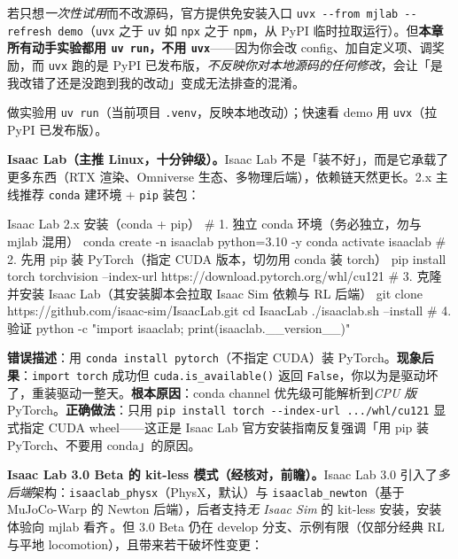 若只想\emph{一次性试用}而不改源码，官方提供免安装入口 \verb|uvx --from mjlab --refresh demo|（\verb|uvx| 之于 \verb|uv| 如 \verb|npx| 之于 \verb|npm|，从 PyPI 临时拉取运行）。但\textbf{本章所有动手实验都用 \texttt{uv run}，不用 \texttt{uvx}}——因为你会改 config、加自定义项、调奖励，而 \verb|uvx| 跑的是 PyPI 已发布版，\emph{不反映你对本地源码的任何修改}，会让「是我改错了还是没跑到我的改动」变成无法排查的混淆。

\begin{note}[一句话记忆]
做实验用 \verb|uv run|（当前项目 \texttt{.venv}，反映本地改动）；快速看 demo 用 \verb|uvx|（拉 PyPI 已发布版）。
\end{note}

\textbf{Isaac Lab（主推 Linux，十分钟级）。}Isaac Lab 不是「装不好」，而是它承载了更多东西（RTX 渲染、Omniverse 生态、多物理后端），依赖链天然更长。2.x 主线推荐 \verb|conda| 建环境 + \verb|pip| 装包：

\begin{codebox}[bash]{Isaac Lab 2.x 安装（conda + pip）}
# 1. 独立 conda 环境（务必独立，勿与 mjlab 混用）
conda create -n isaaclab python=3.10 -y
conda activate isaaclab
# 2. 先用 pip 装 PyTorch（指定 CUDA 版本，切勿用 conda 装 torch）
pip install torch torchvision --index-url https://download.pytorch.org/whl/cu121
# 3. 克隆并安装 Isaac Lab（其安装脚本会拉取 Isaac Sim 依赖与 RL 后端）
git clone https://github.com/isaac-sim/IsaacLab.git
cd IsaacLab
./isaaclab.sh --install
# 4. 验证
python -c "import isaaclab; print(isaaclab.__version__)"
\end{codebox}

\begin{pitfall}
\textbf{错误描述}：用 \verb|conda install pytorch|（不指定 CUDA）装 PyTorch。\textbf{现象后果}：\verb|import torch| 成功但 \verb|cuda.is_available()| 返回 \verb|False|，你以为是驱动坏了，重装驱动一整天。\textbf{根本原因}：conda channel 优先级可能解析到\emph{CPU 版} PyTorch。\textbf{正确做法}：只用 \verb|pip install torch --index-url .../whl/cu121| 显式指定 CUDA wheel——这正是 Isaac Lab 官方安装指南反复强调「用 pip 装 PyTorch、不要用 conda」的原因。
\end{pitfall}

\textbf{Isaac Lab 3.0 Beta 的 kit-less 模式（经核对，前瞻）。}Isaac Lab 3.0 引入了\emph{多后端}架构：\verb|isaaclab_physx|（PhysX，默认）与 \verb|isaaclab_newton|（基于 MuJoCo-Warp 的 Newton 后端），后者支持\emph{无 Isaac Sim} 的 kit-less 安装，安装体验向 mjlab 看齐\,\cite{isaaclab2024}。但 3.0 Beta 仍在 develop 分支、示例有限（仅部分经典 RL 与平地 locomotion），且带来若干破坏性变更：

